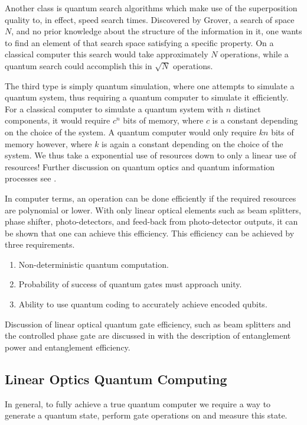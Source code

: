 \documentclass[aps,pra,twocolumn,amsmath,amssymb,nofootinbib,superscriptaddress]{revtex4}
\begin{document}
Another class is quantum search algorithms which make use of the superposition quality to, in effect, speed search times. Discovered by Grover, a search of space $N$, and no prior knowledge about the structure of the information in it, one wants to find an element of that search space satisfying a specific property. On a classical computer this search would take approximately $N$ operations, while a quantum search could accomplish this in $\sqrt{N}$ operations.

The third type is simply quantum simulation, where one attempts to simulate a quantum system, thus requiring a quantum computer to simulate it efficiently. For a classical computer to simulate a quantum system with $n$ distinct components, it would require $c^n$ bits of memory, where $c$ is a constant depending on the choice of the system. A quantum computer would only require $kn$ bits of memory however, where $k$ is again a constant depending on the choice of the system. We thus take a exponential use of resources down to only a linear use of resources! Further discussion on quantum optics and quantum information processes see \cite{walls,aharonov,diVincenzo}.


In computer terms, an operation can be done efficiently if the required resources are polynomial or lower. With only linear optical elements such as beam splitters, phase shifter, photo-detectors, and feed-back from photo-detector outputs, it can be shown that one can achieve this efficiency. This efficiency can be achieved by three requirements.
\begin{enumerate}
\item{Non-deterministic quantum computation.} 
\item{Probability of success of quantum gates must approach unity.}
\item{Ability to use quantum coding to accurately achieve encoded qubits.} 
\end{enumerate}


Discussion of linear optical quantum gate efficiency, such as beam splitters and the controlled phase gate are discussed in \cite{lemr} with the description of entanglement power and entanglement efficiency.
\subsection{Linear Optics Quantum Computing}
In general, to fully achieve a true quantum computer we require a way to generate a quantum state, perform gate operations on and measure this state.
\end{document}
